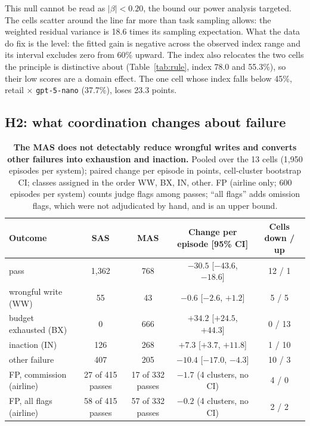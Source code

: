 This null cannot be read as $|\beta| < 0.20$, the bound our power analysis targeted. The cells scatter around the line far more than task sampling allows: the weighted residual variance is 18.6 times its sampling expectation. What the data do fix is the level: the fitted gain is negative across the observed index range and its interval excludes zero from 60\% upward. The index also relocates the two cells the principle is distinctive about (Table~\ref{tab:rule}, index 78.0 and 55.3\%), so their low scores are a domain effect. The one cell whose index falls below 45\%, retail $\times$ \texttt{gpt-5-nano} (37.7\%), loses 23.3 points.

\subsection{H2: what coordination changes about failure}
\label{sec:h4}

\begin{table}[t]
\caption{\textbf{The MAS does not detectably reduce wrongful writes and converts other failures into exhaustion and inaction.} Pooled over the 13 cells (1,950 episodes per system); paired change per episode in points, cell-cluster bootstrap CI; classes assigned in the order WW, BX, IN, other. FP (airline only; 600 episodes per system) counts judge flags among passes; ``all flags'' adds omission flags, which were not adjudicated by hand, and is an upper bound.}
\label{tab:h4}
\begin{center}
\scriptsize
\setlength{\tabcolsep}{4pt}
\begin{tabular}{@{}lcccc@{}}
\toprule
Outcome & SAS & MAS & Change per episode [95\% CI] & Cells down / up \\
\midrule
pass & 1,362 & 768 & $-30.5$ [$-43.6$, $-18.6$] & 12 / 1 \\
wrongful write (WW) & 55 & 43 & $-0.6$ [$-2.6$, $+1.2$] & 5 / 5 \\
budget exhausted (BX) & 0 & 666 & $+34.2$ [$+24.5$, $+44.3$] & 0 / 13 \\
inaction (IN) & 126 & 268 & $+7.3$ [$+3.7$, $+11.8$] & 1 / 10 \\
other failure & 407 & 205 & $-10.4$ [$-17.0$, $-4.3$] & 10 / 3 \\
\midrule
FP, commission (airline) & 27 of 415 passes & 17 of 332 passes & $-1.7$ (4 clusters, no CI) & 4 / 0 \\
FP, all flags (airline) & 58 of 415 passes & 57 of 332 passes & $-0.2$ (4 clusters, no CI) & 2 / 2 \\
\bottomrule
\end{tabular}
\end{center}
\end{table}

